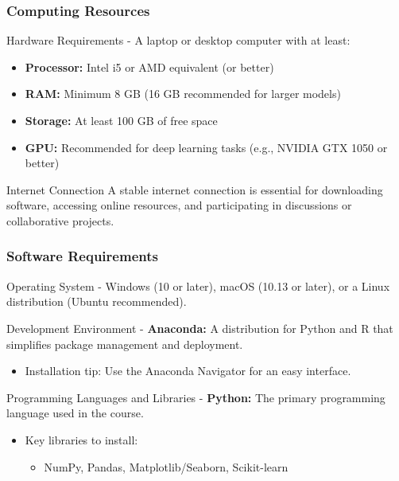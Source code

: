 \documentclass[aspectratio=169]{beamer}
\begin{document}
\begin{frame}[fragile]
    \frametitle{Computing Resources}
    \begin{block}{Hardware Requirements}
        - A laptop or desktop computer with at least:
          \begin{itemize}
              \item \textbf{Processor:} Intel i5 or AMD equivalent (or better)
              \item \textbf{RAM:} Minimum 8 GB (16 GB recommended for larger models)
              \item \textbf{Storage:} At least 100 GB of free space
              \item \textbf{GPU:} Recommended for deep learning tasks (e.g., NVIDIA GTX 1050 or better)
          \end{itemize}
    \end{block}

    \begin{block}{Internet Connection}
        A stable internet connection is essential for downloading software, accessing online resources, and participating in discussions or collaborative projects.
    \end{block}
\end{frame}

\begin{frame}[fragile]
    \frametitle{Software Requirements}
    \begin{block}{Operating System}
        - Windows (10 or later), macOS (10.13 or later), or a Linux distribution (Ubuntu recommended).
    \end{block}

    \begin{block}{Development Environment}
        - \textbf{Anaconda:} A distribution for Python and R that simplifies package management and deployment.
        \begin{itemize}
            \item Installation tip: Use the Anaconda Navigator for an easy interface.
        \end{itemize}
    \end{block}

    \begin{block}{Programming Languages and Libraries}
        - \textbf{Python:} The primary programming language used in the course.
        \begin{itemize}
            \item Key libraries to install:
                \begin{itemize}
                    \item NumPy, Pandas, Matplotlib/Seaborn, Scikit-learn
                \end{itemize}
        \end{itemize}
    \end{block}
\end{frame}
\end{document}

